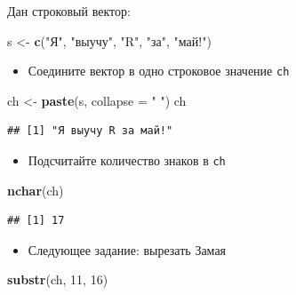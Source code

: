 \documentclass[]{book}
\newenvironment{Shaded}{\begin{snugshade}}{\end{snugshade}}
\newcommand{\KeywordTok}[1]{\textcolor[rgb]{0.13,0.29,0.53}{\textbf{#1}}}
\newcommand{\DataTypeTok}[1]{\textcolor[rgb]{0.13,0.29,0.53}{#1}}
\newcommand{\DecValTok}[1]{\textcolor[rgb]{0.00,0.00,0.81}{#1}}
\newcommand{\StringTok}[1]{\textcolor[rgb]{0.31,0.60,0.02}{#1}}
\newcommand{\NormalTok}[1]{#1}
\providecommand{\tightlist}{%
  \setlength{\itemsep}{0pt}\setlength{\parskip}{0pt}}
\begin{document}
Дан строковый вектор:

\begin{Shaded}
\begin{Highlighting}[]
\NormalTok{s <-}\StringTok{ }\KeywordTok{c}\NormalTok{(}\StringTok{"Я"}\NormalTok{, }\StringTok{"выучу"}\NormalTok{, }\StringTok{"R"}\NormalTok{, }\StringTok{"за"}\NormalTok{, }\StringTok{"май!"}\NormalTok{)}
\end{Highlighting}
\end{Shaded}

\begin{itemize}
\tightlist
\item
  Соедините вектор в одно строковое значение \texttt{ch}
\end{itemize}

\begin{Shaded}
\begin{Highlighting}[]
\NormalTok{ch <-}\StringTok{ }\KeywordTok{paste}\NormalTok{(s, }\DataTypeTok{collapse =} \StringTok{" "}\NormalTok{)}
\NormalTok{ch}
\end{Highlighting}
\end{Shaded}

\begin{verbatim}
## [1] "Я выучу R за май!"
\end{verbatim}

\begin{itemize}
\tightlist
\item
  Подсчитайте количество знаков в \texttt{ch}
\end{itemize}

\begin{Shaded}
\begin{Highlighting}[]
\KeywordTok{nchar}\NormalTok{(ch)}
\end{Highlighting}
\end{Shaded}

\begin{verbatim}
## [1] 17
\end{verbatim}

\begin{itemize}
\tightlist
\item
  Следующее задание: вырезать Замая
\end{itemize}

\begin{Shaded}
\begin{Highlighting}[]
\KeywordTok{substr}\NormalTok{(ch, }\DecValTok{11}\NormalTok{, }\DecValTok{16}\NormalTok{)}
\end{Highlighting}
\end{Shaded}
\end{document}
